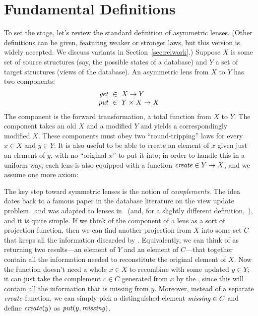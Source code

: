 \section{Fundamental Definitions} \label{symm}

\ifcomplement
{}
%
To set the stage, let's review the standard definition of
asymmetric lenses.  
%
(Other definitions can be given, featuring weaker or stronger laws, but this
version is widely accepted.  We discuss variants in
Section~\ref{sec:relwork}.)
%
Suppose $X$ is some set of source structures (say, the possible states of a
database) and $Y$ a set of target structures (views of the database).
%
An asymmetric lens from $X$ to $Y$ has two components:
\[ 
\begin{array}{r@{\ \;}c@{\ \;}l}
\GET &\in& X \arrow Y\\
\PUT &\in& Y \times X \arrow X
\end{array}
\]
The \GET{} component is the forward transformation, a total function from
$X$ to $Y$.  The \PUT{} component takes an old $X$ and a modified $Y$ and
yields a correspondingly modified $X$.  These components
must obey two ``round-tripping'' laws for every $x \in X$ and $y
\in Y$:
%
%
It is also useful to be able to create an element of $x$ given just an
element of $y$, with no ``original $x$'' to put it into; in order to handle
this in a 
uniform way, each lens is also equipped with a
function $\mathit{create}\in Y\rightarrow X$, and we assume one more axiom:
\fi%

%
The key  step toward symmetric lenses is the notion
of {\em complements}.  The idea dates back to a famous paper in the
database literature on the view update
problem~\cite{DBLP:journals/tods/BancilhonS81} and was adapted to
lenses in~\cite{Matching10} (and, for a slightly different
definition,~\cite{matsuda2007btb}), and it is quite simple.  If we think of
the    
\GET{} component of a lens as a sort of projection function, then we can find
another projection from $X$ into some set $C$ that
keeps all the information discarded by \GET{}.  Equivalently, we can think
of \GET{} as returning two results---an element of $Y$ and an element of
$C$---that together contain all the information needed to reconstitute the
original element of $X$.  Now the \PUT{} function doesn't need a whole $x\in
X$ to recombine with some updated $y\in Y$; it can
just take the complement $c\in C$ generated from $x$ by the \GET, since this
will 
contain all the information that is missing from $y$.  Moreover, instead of
a separate
$\mathit{create}$ function, we can simply pick a distinguished element
$\mathit{missing}\in C$ and define $\mathit{create}(y)$ as $\mathit{put}(y,\mathit{missing})$.

